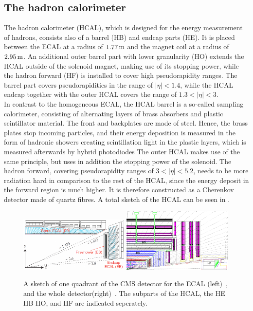 \subsection{The hadron calorimeter}
The hadron calorimeter (HCAL), which is designed for the energy measurement of hadrons, consists also of a barrel (HB) and endcap parts (HE). It is placed between the ECAL at a radius of $1.77\,\text{m}$ and the magnet coil at a radius of $2.95\,\text{m}$. An additional outer barrel part with lower granularity (HO) extends the HCAL outside of the solenoid magnet, making use of its stopping power, while the hadron forward (HF) is installed to cover high pseudorapidity ranges. The barrel part covers pseudorapidities in the range of $|\eta|<1.4$, while the HCAL endcap together with the outer HCAL covers the range of $1.3<|\eta|<3$.\\
In contrast to the homogeneous ECAL, the HCAL barrel is a so-called sampling calorimeter, consisting of alternating layers of brass absorbers and plastic scintillator material. The front and backplates are made of steel. Hence, the brass plates stop incoming particles, and their energy deposition is measured in the form of hadronic showers creating scintillation light in the plastic layers, which is measured afterwards by hybrid photodiodes The outer HCAL makes use of the same principle, but uses in addition the stopping power of the solenoid. The hadron forward, covering pseudorapidity ranges of $3<|\eta|<5.2$, needs to be more radiation hard in comparison to the rest of the HCAL, since the energy deposit in the forward region is much higher. It is therefore constructed as a Cherenkov detector made of quartz fibres. A total sketch of the HCAL can be seen in .

\begin{figure}[tbp]
 \centering
 \includegraphics[width=0.49\textwidth]{figures/general/ecal}
 \includegraphics[width=0.49\textwidth]{figures/general/hcal}
 \caption{A sketch of one quadrant of the CMS detector for the ECAL (left)~\cite{ECALPicture}, and the whole detector(right)~\cite{CMS}. The subparts of the HCAL, the HE HB HO, and HF are indicated seperately.}
 \label{fig:etaPlaneCMS}
\end{figure}

